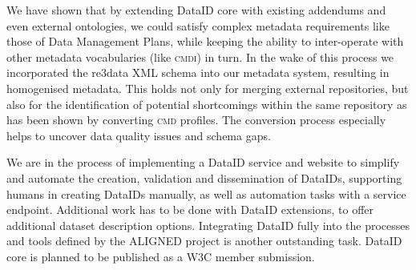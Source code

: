 \documentclass[runningheads,a4paper]{llncs}
\newcommand{\cmdi}{{\scshape cmdi}\xspace}
\newcommand{\cmd}{{\scshape cmd}\xspace}
\newcommand{\dmp}{{\scshape dmp}\xspace}
\begin{document}
We have shown that by extending DataID core with existing addendums and even external ontologies, we could satisfy complex metadata requirements like those of Data Management Plans, while keeping the ability to inter-operate with other metadata vocabularies (like \cmdi) in turn. In the wake of this process we incorporated the re3data XML schema into our metadata system, resulting in homogenised metadata. This holds not only for merging external repositories, but also for the identification of potential shortcomings within the same repository as has been shown by converting \cmd profiles. The conversion process especially helps to uncover data quality issues and schema gaps.


We are in the process of implementing a DataID service and website to simplify and automate the creation, validation and dissemination of DataIDs, supporting humans in creating DataIDs manually, as well as automation tasks with a service endpoint. Additional work has to be done with DataID extensions, to offer additional dataset description options. Integrating DataID fully into the processes and tools defined by the ALIGNED project is another outstanding task.
DataID core is planned to be published as a W3C member submission.
\end{document}
